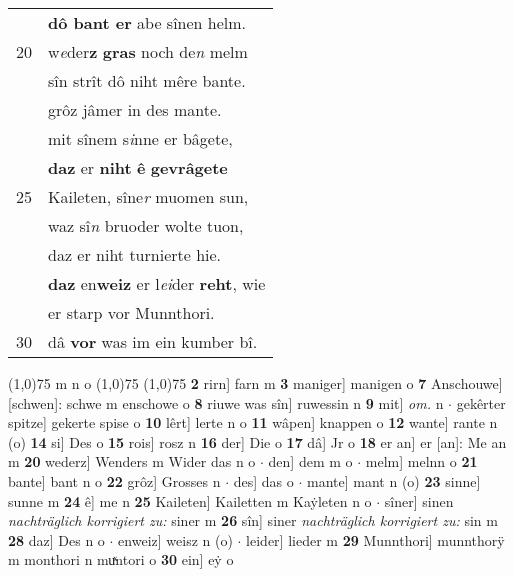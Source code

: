 \documentclass[8pt,a4paper,notitlepage]{article}
\begin{document}
\begin{table}[ht]
\begin{minipage}[t]{0.5\linewidth}
\begin{tabular}{rl}
 & \textbf{dô bant er} abe sînen helm.\\ 
20 & w\textit{e}der\textbf{z} \textbf{gras} noch de\textit{n} melm\\ 
 & sîn strît dô niht mêre bante.\\ 
 & grôz jâmer in des mante.\\ 
 & mit sînem s\textit{i}nne er bâgete,\\ 
 & \textbf{daz} er \textbf{niht} \textbf{ê} \textbf{gevrâgete}\\ 
25 & Kaileten, sîne\textit{r} muomen sun,\\ 
 & waz sî\textit{n} bruoder wolte tuon,\\ 
 & daz er niht turnierte hie.\\ 
 & \textbf{daz} en\textbf{weiz} er l\textit{ei}der \textbf{reht}, wie\\ 
 & er starp vor Munnthori.\\ 
30 & dâ \textbf{vor} was im ein kumber bî.\\ 
\end{tabular}
\scriptsize
\line(1,0){75} \newline
m n o \newline
\line(1,0){75} \newline
\newline
\line(1,0){75} \newline
\textbf{2} rirn] farn m \textbf{3} maniger] manigen o \textbf{7} Anschouwe] [schwen]: schwe m enschowe o \textbf{8} riuwe was sîn] ruwessin n \textbf{9} mit] \textit{om.} n  $\cdot$ gekêrter spitze] gekerte spise o \textbf{10} lêrt] lerte n o \textbf{11} wâpen] knappen o \textbf{12} wante] rante n (o) \textbf{14} si] Des o \textbf{15} rois] rosz n \textbf{16} der] Die o \textbf{17} dâ] Jr o \textbf{18} er an] er [an]: Me an m \textbf{20} wederz] Wenders m Wider das n o  $\cdot$ den] dem m o  $\cdot$ melm] melnn o \textbf{21} bante] bant n o \textbf{22} grôz] Grosses n  $\cdot$ des] das o  $\cdot$ mante] mant n (o) \textbf{23} sinne] sunne m \textbf{24} ê] me n \textbf{25} Kaileten] Kailetten m Kaẏleten n o  $\cdot$ sîner] sinen \textit{nachträglich korrigiert zu:} siner m \textbf{26} sîn] siner \textit{nachträglich korrigiert zu:} sin m \textbf{28} daz] Des n o  $\cdot$ enweiz] weisz n (o)  $\cdot$ leider] lieder m \textbf{29} Munnthori] munnthorÿ m monthori n muͯntori o \textbf{30} ein] eẏ o \newline
\end{minipage}
\end{table}
\newpage
\end{document}

